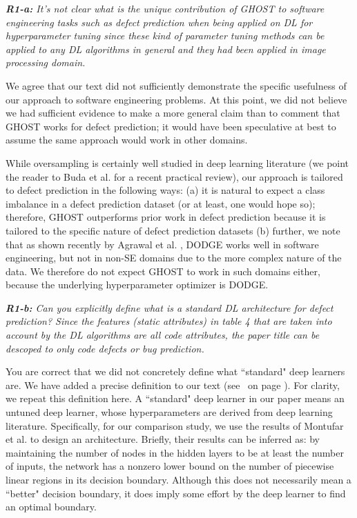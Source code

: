 \documentclass[10pt,compsoc,twocolumn]{IEEEtran}
\newcommand{\respto}[1]{
\fcolorbox{black}{black!15}{%
\label{resp:#1}%
\bf\scriptsize R{#1}}}
\newcommand{\BLUE}{\color{blue}}
\newcommand{\BLACK}{\color{black}}
\newcommand{\citeresp}[1]{%
{(see }\fcolorbox{black}{black!15}{%
\bf\scriptsize R{#1}}~{{on page \pageref{resp:#1})}}}%
\begin{document}
{\em {\bf R1-a:} It’s not clear what is the unique contribution of GHOST to software engineering tasks such as defect prediction when being applied on DL for hyperparameter tuning since these kind of parameter tuning methods can be applied to any DL algorithms in general and they had been applied in image processing domain.}

\respto{1a1}
\BLUE
 We agree that our text did not sufficiently demonstrate the specific usefulness of our approach to software engineering problems. At this point, we did not believe we had sufficient evidence to make a more general claim than to comment that GHOST works for defect prediction; it would have been speculative at best to assume the same approach would work in other domains.

While oversampling is certainly well studied in deep learning literature (we point the reader to Buda et al. \cite{buda2018systematic} for a recent practical review), our approach is tailored to defect prediction in the following ways: (a) it is natural to expect a class imbalance in a defect prediction dataset (or at least, one would hope so); therefore, GHOST outperforms prior work in defect prediction because it is tailored to the specific nature of defect prediction datasets (b) further, we note that as shown recently by Agrawal et al. \cite{agrawal2020simpler}, DODGE works well in software engineering, but not in non-SE domains due to the more complex nature of the data. We therefore do not expect GHOST to work in such domains either, because the underlying hyperparameter optimizer is DODGE.
\BLACK

{\em {\bf R1-b:} Can you explicitly define what is a standard DL architecture for defect prediction?
Since the features (static attributes) in table 4 that are taken into account by the DL algorithms are all code attributes, the paper title can be descoped to only code defects or bug prediction.}

\respto{1a2}
\BLUE
You are correct that we did not concretely define what ``standard" deep learners are. We have added a precise definition to our text \citeresp{1a2.1}. For clarity, we repeat this definition here. A ``standard" deep learner in our paper means an untuned deep learner, whose hyperparameters are derived from deep learning literature. Specifically, for our comparison study, we use the results of Montufar et al. \cite{montufar2014number} to design an architecture. Briefly, their results can be inferred as: by maintaining the number of nodes in the hidden layers to be at least the number of inputs, the network has a nonzero lower bound on the number of piecewise linear regions in its decision boundary. Although this does not necessarily mean a ``better" decision boundary, it does imply some effort by the deep learner to find an optimal boundary.
\end{document}

